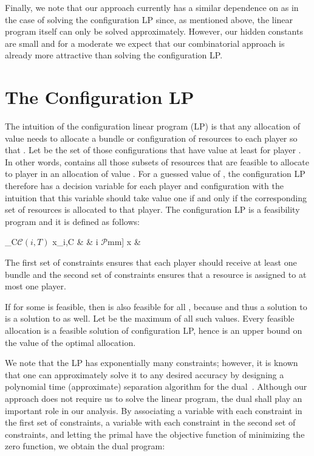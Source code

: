 \documentclass{llncs}
\newcommand{\players}{\ensuremath{\mathcal{P}}\xspace}
\newcommand{\conf}[1]{\ensuremath{\mathcal{C}(#1)}}
\begin{document}
Finally, we note that our approach currently has a similar dependence on
 as in the case of solving the configuration LP since, as
mentioned above, the linear program itself can only be solved
approximately. However, our hidden constants are small and for a
moderate  we  expect that our combinatorial approach is
already more attractive than solving the configuration LP.



\section{The Configuration LP}
\label{sec:CLP}
The intuition of the configuration linear program (LP) is that any
allocation of value  needs to allocate a bundle or configuration
 of resources to each player  so that .  Let
 be the set of those configurations that have value at
least  for player . In other words,  contains all
those subsets of resources that are feasible to allocate to player 
in an allocation of value . For a guessed value of , the
configuration LP therefore has a decision variable  for each
player  and configuration  with the
intuition that this variable should take value one if and only if the
corresponding set of resources is allocated to that player. The configuration LP
 is a feasibility program and it is defined as follows:

            \sum_{C\in \conf{i,T}} x_{i,C} &  &  i \in \players \1mm]
            x & 
          
The first set of constraints ensures that each player should receive
at least one bundle and the second set of constraints ensures that a
resource is assigned to at most one player.

If  for some  is feasible, then  is also feasible for all
, because  and thus a solution to
 is a solution to  as well. Let 
be the maximum of all such values. Every
feasible allocation is a feasible solution of configuration LP, hence
 is an upper bound on the value of the optimal allocation.

We note that the LP has exponentially many constraints; however, it is
known that one can approximately solve it to any desired
accuracy by designing a polynomial time (approximate) separation algorithm for the
dual~\cite{BS06}. Although our approach does not require us to solve the linear
program, the dual shall play an important role in our analysis.  By
associating a variable  with each constraint in the first set of
constraints, a variable  with each constraint in the second set of
constraints, and letting the primal have the objective function of
minimizing the zero function, we obtain the dual program:
\end{document}
